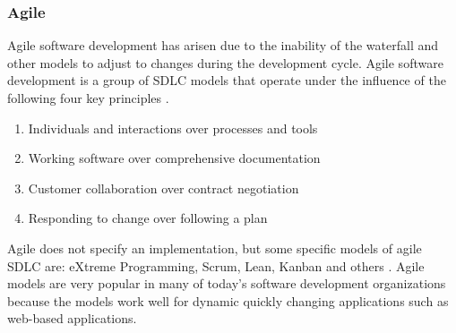\documentclass[SDSUThesis.tex]{subfiles}
\begin{document}
        
    \subsubsection{Agile}
        Agile software development has arisen due to the inability
        of the waterfall and other models to adjust to changes during the 
        development cycle.  
        Agile software development is a group of SDLC models that operate
        under the influence of the following four key principles \cite{Beck2001}.
        \begin{enumerate}
            \item Individuals and interactions over processes and tools
            \item Working software over comprehensive documentation
            \item Customer collaboration over contract negotiation
            \item Responding to change over following a plan
        \end{enumerate}
        Agile does not specify an implementation, but
        some specific models of agile SDLC are:
        eXtreme Programming, Scrum, Lean, Kanban and others 
        \cite{Moniruzzaman2013, Hibbs2009}.  Agile models 
        are very popular in many of today's software development
        organizations because the models work well for dynamic
        quickly changing applications such as web-based applications.
        
        
\end{document}
